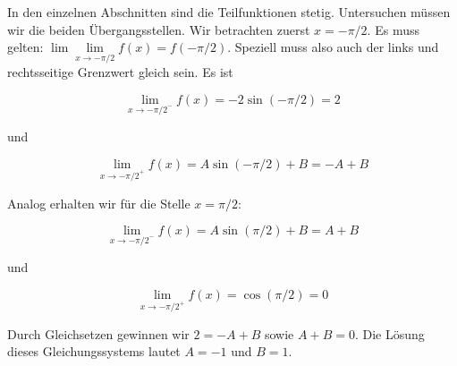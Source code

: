 \item In den einzelnen Abschnitten sind die Teilfunktionen stetig. Untersuchen müssen wir die beiden Übergangsstellen. Wir betrachten zuerst $x=-\pi/2$. Es muss gelten: $\lim\lim\limits_{x\to-\pi/2} f(x) = f(-\pi/2)$. Speziell muss also auch der links und rechtsseitige Grenzwert gleich sein. Es ist

$$
  \lim\limits_{x\to{-\pi/2}^{-}} f(x) = -2\sin(-\pi/2) = 2
$$

und

$$
  \lim\limits_{x\to{-\pi/2}^{+}} f(x) = A\sin(-\pi/2)+ B = -A+B
$$

Analog erhalten wir für die Stelle $x=\pi/2$:

$$
  \lim\limits_{x\to{-\pi/2}^{-}} f(x) = A\sin(\pi/2) + B = A+B
$$

und

$$
  \lim\limits_{x\to{-\pi/2}^{+}} f(x) = \cos(\pi/2) = 0
$$

Durch Gleichsetzen gewinnen wir $2=-A+B$ sowie $A+B=0$. Die Lösung dieses Gleichungssystems lautet $A=-1$ und $B=1$.
